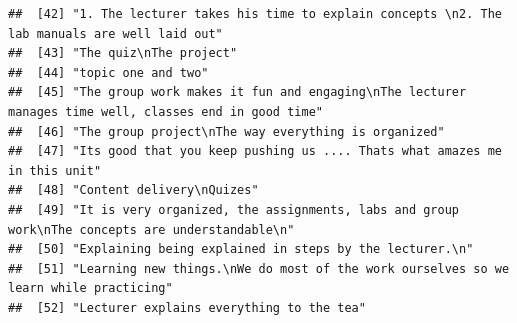 \documentclass[
]{article}
\begin{document}
\begin{verbatim}
##  [42] "1. The lecturer takes his time to explain concepts \n2. The lab manuals are well laid out"                                                                                                                                                        
##  [43] "The quiz\nThe project"                                                                                                                                                                                                                            
##  [44] "topic one and two"                                                                                                                                                                                                                                
##  [45] "The group work makes it fun and engaging\nThe lecturer manages time well, classes end in good time"                                                                                                                                               
##  [46] "The group project\nThe way everything is organized"                                                                                                                                                                                               
##  [47] "Its good that you keep pushing us .... Thats what amazes me in this unit"                                                                                                                                                                         
##  [48] "Content delivery\nQuizes"                                                                                                                                                                                                                         
##  [49] "It is very organized, the assignments, labs and group work\nThe concepts are understandable\n"                                                                                                                                                    
##  [50] "Explaining being explained in steps by the lecturer.\n"                                                                                                                                                                                           
##  [51] "Learning new things.\nWe do most of the work ourselves so we learn while practicing"                                                                                                                                                              
##  [52] "Lecturer explains everything to the tea"                                                                                                                                                                                                          

\end{verbatim}
\end{document}
